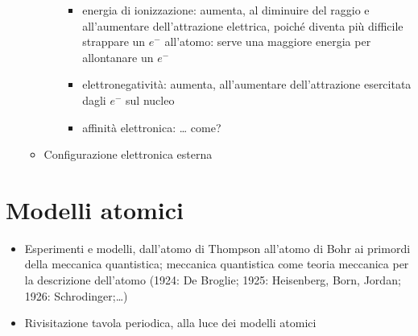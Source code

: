 \documentclass[letterpaper,10pt,english]{jupyterBook}
\begin{document}
\begin{itemize}
\begin{itemize}
\begin{itemize}
\begin{itemize}
\item {} 
\sphinxAtStartPar
energia di ionizzazione: aumenta, al diminuire del raggio e all’aumentare dell’attrazione elettrica, poiché diventa più difficile strappare un \(e^-\) all’atomo: serve una maggiore energia per allontanare un \(e^-\)

\item {} 
\sphinxAtStartPar
elettronegatività: aumenta, all’aumentare dell’attrazione esercitata dagli \(e^-\) sul nucleo

\item {} 
\sphinxAtStartPar
affinità elettronica: …  come?

\end{itemize}

\end{itemize}

\item {} 
\sphinxAtStartPar
Configurazione elettronica esterna

\end{itemize}

\end{itemize}


\section{Modelli atomici}
\label{\detokenize{ch/units:modelli-atomici}}
\sphinxAtStartPar
{}
\begin{itemize}
\item {} 
\sphinxAtStartPar
Esperimenti e modelli, dall’atomo di Thompson all’atomo di Bohr ai primordi della meccanica quantistica; meccanica quantistica come teoria meccanica per la descrizione dell’atomo (1924: De Broglie; 1925: Heisenberg, Born, Jordan; 1926: Schrodinger;…)

\item {} 
\sphinxAtStartPar
Rivisitazione tavola periodica, alla luce dei modelli atomici

\end{itemize}
\end{document}
